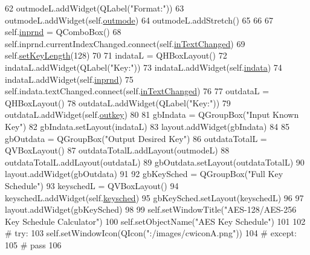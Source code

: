 \begin{DoxyCode}
62         outmodeL.addWidget(QLabel(\textcolor{stringliteral}{"Format:"}))
63         outmodeL.addWidget(self.\hyperlink{classsoftware_1_1chipwhisperer_1_1common_1_1ui_1_1KeyScheduleDialog_1_1KeyScheduleDialog_ac9f84960ed192212c88c3ce3beab65e5}{outmode})
64         outmodeL.addStretch()
65 
66 
67         self.\hyperlink{classsoftware_1_1chipwhisperer_1_1common_1_1ui_1_1KeyScheduleDialog_1_1KeyScheduleDialog_aa8e996aa6caacc753da7a394a1aa9800}{inprnd} = QComboBox()
68         self.inprnd.currentIndexChanged.connect(self.\hyperlink{classsoftware_1_1chipwhisperer_1_1common_1_1ui_1_1KeyScheduleDialog_1_1KeyScheduleDialog_ac2575bc805f4fd64d0aeb4b4e7558e3d}{inTextChanged})
69         self.\hyperlink{classsoftware_1_1chipwhisperer_1_1common_1_1ui_1_1KeyScheduleDialog_1_1KeyScheduleDialog_a5e76fb8372319d20427cbf8e1101a897}{setKeyLength}(128)
70 
71         indataL = QHBoxLayout()
72         indataL.addWidget(QLabel(\textcolor{stringliteral}{"Key:"}))
73         indataL.addWidget(self.\hyperlink{classsoftware_1_1chipwhisperer_1_1common_1_1ui_1_1KeyScheduleDialog_1_1KeyScheduleDialog_a10bbf83fdd1bad21a7c6a23979bf67f5}{indata})
74         indataL.addWidget(self.\hyperlink{classsoftware_1_1chipwhisperer_1_1common_1_1ui_1_1KeyScheduleDialog_1_1KeyScheduleDialog_aa8e996aa6caacc753da7a394a1aa9800}{inprnd})
75         self.indata.textChanged.connect(self.\hyperlink{classsoftware_1_1chipwhisperer_1_1common_1_1ui_1_1KeyScheduleDialog_1_1KeyScheduleDialog_ac2575bc805f4fd64d0aeb4b4e7558e3d}{inTextChanged})
76 
77         outdataL = QHBoxLayout()
78         outdataL.addWidget(QLabel(\textcolor{stringliteral}{"Key:"}))
79         outdataL.addWidget(self.\hyperlink{classsoftware_1_1chipwhisperer_1_1common_1_1ui_1_1KeyScheduleDialog_1_1KeyScheduleDialog_a42b500f9ca375483f89049cdece0c11d}{outkey})
80 
81         gbIndata = QGroupBox(\textcolor{stringliteral}{"Input Known Key"})
82         gbIndata.setLayout(indataL)
83         layout.addWidget(gbIndata)
84 
85         gbOutdata = QGroupBox(\textcolor{stringliteral}{"Output Desired Key"})
86         outdataTotalL = QVBoxLayout()
87         outdataTotalL.addLayout(outmodeL)
88         outdataTotalL.addLayout(outdataL)
89         gbOutdata.setLayout(outdataTotalL)
90         layout.addWidget(gbOutdata)
91 
92         gbKeySched = QGroupBox(\textcolor{stringliteral}{"Full Key Schedule"})
93         keyschedL = QVBoxLayout()
94         keyschedL.addWidget(self.\hyperlink{classsoftware_1_1chipwhisperer_1_1common_1_1ui_1_1KeyScheduleDialog_1_1KeyScheduleDialog_a247b0a323e4f2541203896afa0b25950}{keysched})
95         gbKeySched.setLayout(keyschedL)
96 
97         layout.addWidget(gbKeySched)
98 
99         self.setWindowTitle(\textcolor{stringliteral}{"AES-128/AES-256 Key Schedule Calculator"})
100         self.setObjectName(\textcolor{stringliteral}{"AES Key Schedule"})
101 
102         \textcolor{comment}{# try:}
103         self.setWindowIcon(QIcon(\textcolor{stringliteral}{":/images/cwiconA.png"}))
104         \textcolor{comment}{# except:}
105         \textcolor{comment}{#    pass}
106 
\end{DoxyCode}


